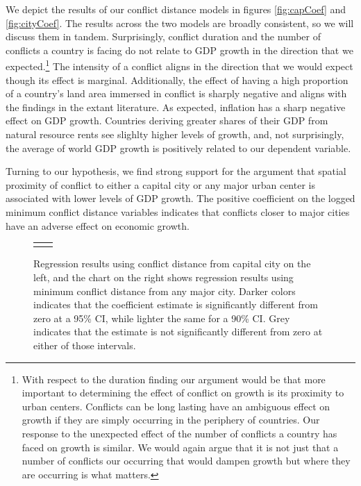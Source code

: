 We depict the results of our conflict distance models in figures \ref{fig:capCoef} and \ref{fig:cityCoef}. The results across the two models are broadly consistent, so we will discuss them in tandem. Surprisingly, conflict duration and the number of conflicts a country is facing do not relate to GDP growth in the direction that we expected.\footnote{With respect to the duration finding our argument would be that more important to determining the effect of conflict on growth is its proximity to urban centers. Conflicts can be long lasting have an ambiguous effect on growth if they are simply occurring in the periphery of countries. Our response to the unexpected effect of the number of conflicts a country has faced on growth is similar. We would again argue that it is not just that a number of conflicts our occurring that would dampen growth but where they are occurring is what matters.} The intensity of a conflict aligns in the direction that we would expect though its effect is marginal. Additionally, the effect of having a high proportion of a country's land area immersed in conflict is sharply negative and aligns with the findings in the extant literature. As expected, inflation has a sharp negative effect on GDP growth. Countries deriving greater shares of their GDP from natural resource rents see slighlty higher levels of growth, and, not surprisingly, the average of world GDP growth is positively related to our dependent variable.

Turning to our hypothesis, we find strong support for the argument that spatial proximity of conflict to either a capital city or any major urban center is associated with lower levels of GDP growth. The positive coefficient on the logged minimum conflict distance variables indicates that conflicts closer to major cities have an adverse effect on economic growth. 

\begin{figure}
	\centering
	\begin{tabular}{cc}
		\subfloat[SubFigure 1][Capital City]{
			\resizebox{.45\textwidth}{!}{}
		\label{fig:capCoef}} &
		\subfloat[SubFigure 2][Any Major City]{
			\resizebox{.45\textwidth}{!}{}
		\label{fig:cityCoef}}
	\end{tabular}
	\caption{Regression results using conflict distance from capital city on the left, and the chart on the right shows regression results using minimum conflict distance from any major city. Darker colors indicates that the coefficient estimate is significantly different from zero at a 95\% CI, while lighter the same for a 90\% CI. Grey indicates that the estimate is not significantly different from zero at either of those intervals.}
	\label{fig:coefplot}
\end{figure}

